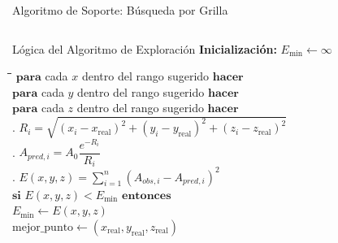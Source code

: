 

\begin{frame}{Algoritmo de Soporte: Búsqueda por Grilla}

    \begin{columns}[T]


        \begin{exampleblock}{Lógica del Algoritmo de Exploración}
            \scriptsize
            \textbf{Inicialización:} $E_{\text{min}} \leftarrow \infty$ \\[0.15cm]
            \begin{tabbing}
                \quad \= \quad \= \quad \= \quad \= \kill
                $\mathbf{para}$ cada $x$ dentro del rango sugerido $\mathbf{hacer}$ \\
                \> $\mathbf{para}$ cada $y$ dentro del rango sugerido $\mathbf{hacer}$ \\
                \> \> $\mathbf{para}$ cada $z$ dentro del rango sugerido $\mathbf{hacer}$ \\[0.1cm]
                \> \> . $R_i = \sqrt{(x_i - x_{\text{real}})^2 + (y_i - y_{\text{real}})^2 + (z_i - z_{\text{real}})^2}$ \\
                \> \> . $A_{pred,i} = A_0 \dfrac{e^{-R_i}}{R_i}$ \\
                \> \> . $E(x,y,z) = \sum_{i=1}^{n} (A_{obs,i} - A_{pred,i})^2$ \\[0.1cm]
                \> \> \> $\mathbf{si}$ $E(x,y,z) < E_{\text{min}}$ $\mathbf{entonces}$ \\
                \> \> \> \> $E_{\text{min}} \leftarrow E(x,y,z)$ \\
                \> \> \> \> $\text{mejor\_punto} \leftarrow (x_{\text{real}}, y_{\text{real}}, z_{\text{real}})$
            \end{tabbing}
        \end{exampleblock}



\end{columns}
\end{frame}
